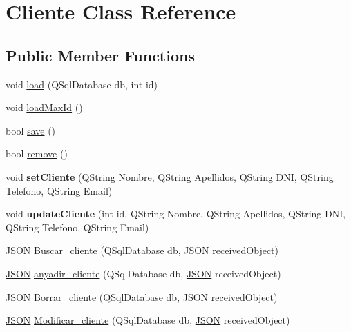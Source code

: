 \hypertarget{classCliente}{}\section{Cliente Class Reference}
\label{classCliente}
\subsection*{Public Member Functions}
\begin{DoxyCompactItemize}
\item 
void \mbox{\hyperlink{classCliente_a2fffa29c5f9c5789b4ea383e0a880bb3}{load}} (Q\+Sql\+Database db, int id)
\item 
void \mbox{\hyperlink{classCliente_a00ab8014b69d2a87746dc1a62d26553a}{load\+Max\+Id}} ()
\item 
bool \mbox{\hyperlink{classCliente_a7c66dee805434f57fa5fa1322fc99312}{save}} ()
\item 
bool \mbox{\hyperlink{classCliente_a8f80581958278a04ead3224e5c840178}{remove}} ()
\item 
\mbox{\label{classCliente_af54d252995a415d26d1f0ab2137c5a2b}} 
void {\bfseries set\+Cliente} (Q\+String Nombre, Q\+String Apellidos, Q\+String D\+NI, Q\+String Telefono, Q\+String Email)
\item 
\mbox{\label{classCliente_a2d83adac4ca30293f35f61442222437b}} 
void {\bfseries update\+Cliente} (int id, Q\+String Nombre, Q\+String Apellidos, Q\+String D\+NI, Q\+String Telefono, Q\+String Email)
\item 
\mbox{\hyperlink{classnlohmann_1_1basic__json}{J\+S\+ON}} \mbox{\hyperlink{classCliente_ac448f4e423f0e60d706e5e20e88212a9}{Buscar\+\_\+cliente}} (Q\+Sql\+Database db, \mbox{\hyperlink{classnlohmann_1_1basic__json}{J\+S\+ON}} received\+Object)
\item 
\mbox{\hyperlink{classnlohmann_1_1basic__json}{J\+S\+ON}} \mbox{\hyperlink{classCliente_a7411b49f5697dbb2eb47bff72f5681d4}{anyadir\+\_\+cliente}} (Q\+Sql\+Database db, \mbox{\hyperlink{classnlohmann_1_1basic__json}{J\+S\+ON}} received\+Object)
\item 
\mbox{\hyperlink{classnlohmann_1_1basic__json}{J\+S\+ON}} \mbox{\hyperlink{classCliente_ae439ec32dce5171c876e9a6210ca8633}{Borrar\+\_\+cliente}} (Q\+Sql\+Database db, \mbox{\hyperlink{classnlohmann_1_1basic__json}{J\+S\+ON}} received\+Object)
\item 
\mbox{\hyperlink{classnlohmann_1_1basic__json}{J\+S\+ON}} \mbox{\hyperlink{classCliente_a157d0a57e3a159c60395b0ef7cbafec7}{Modificar\+\_\+cliente}} (Q\+Sql\+Database db, \mbox{\hyperlink{classnlohmann_1_1basic__json}{J\+S\+ON}} received\+Object)
\end{DoxyCompactItemize}
